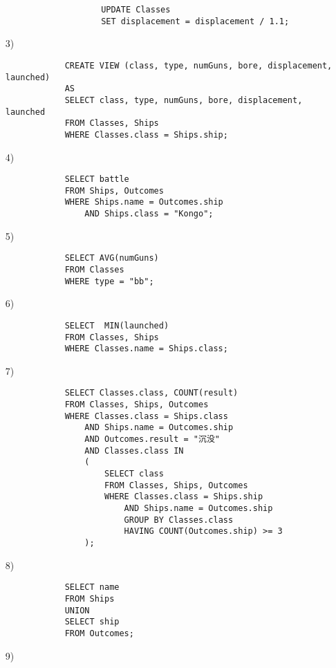 \documentclass[10pt,a4paper]{article}
\begin{document}
\begin{enumerate}
\begin{itemize}
\begin{verbatim}
                UPDATE Classes
                SET displacement = displacement / 1.1;
            \end{verbatim}  
        \end{itemize}
        \item[3)]\begin{verbatim}
            CREATE VIEW (class, type, numGuns, bore, displacement, launched)
            AS
            SELECT class, type, numGuns, bore, displacement, launched
            FROM Classes, Ships
            WHERE Classes.class = Ships.ship;
        \end{verbatim}
        \item[4)]\begin{verbatim}
            SELECT battle
            FROM Ships, Outcomes
            WHERE Ships.name = Outcomes.ship
                AND Ships.class = "Kongo";
        \end{verbatim}
        \item[5)]\begin{verbatim}
            SELECT AVG(numGuns)
            FROM Classes
            WHERE type = "bb";
        \end{verbatim}
        \item[6)]\begin{verbatim}
            SELECT  MIN(launched)
            FROM Classes, Ships
            WHERE Classes.name = Ships.class;
        \end{verbatim}
        \item[7)]\begin{verbatim}
            SELECT Classes.class, COUNT(result)
            FROM Classes, Ships, Outcomes
            WHERE Classes.class = Ships.class
                AND Ships.name = Outcomes.ship
                AND Outcomes.result = "沉没"
                AND Classes.class IN
                (
                    SELECT class
                    FROM Classes, Ships, Outcomes
                    WHERE Classes.class = Ships.ship
                        AND Ships.name = Outcomes.ship
                        GROUP BY Classes.class
                        HAVING COUNT(Outcomes.ship) >= 3
                );
        \end{verbatim}
        \item[8)]\begin{verbatim}
            SELECT name
            FROM Ships
            UNION
            SELECT ship
            FROM Outcomes;
        \end{verbatim}
        \item[9)]\begin{verbatim}

\end{verbatim}
\end{enumerate}
\end{document}
